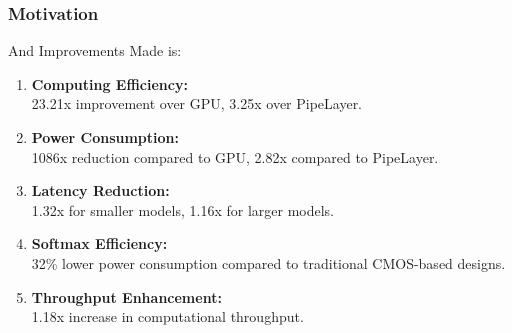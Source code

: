 \documentclass[
	12pt, %
]{beamer}
\begin{document}
%	
%		
%		
%		
%		



\begin{frame}
	\frametitle{Motivation}
	
	And Improvements Made is:
	\begin{enumerate}
		\item
		\textbf{Computing Efficiency: }\\
		23.21x improvement over GPU, 3.25x over PipeLayer.
		
		\item 
		\textbf{Power Consumption:}\\
		1086x reduction compared to GPU, 2.82x compared to PipeLayer.
		
		\item 
		\textbf{Latency Reduction:}\\
		1.32x for smaller models, 1.16x for larger models.
		
		\item 
		\textbf{Softmax Efficiency:}\\
		32\% lower power consumption compared to traditional CMOS-based designs.
		
		\item 
		\textbf{Throughput Enhancement:}\\
		1.18x increase in computational throughput.
	\end{enumerate}
\end{frame}
\end{document}

